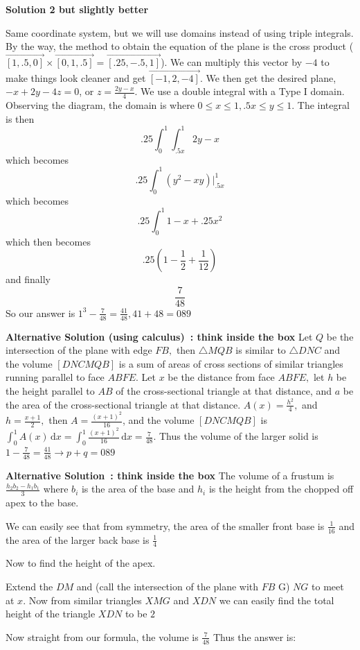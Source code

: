 \begin{enumerate}
 



\textbf{Solution 2 but slightly better}

Same coordinate system, but we will use domains instead of using triple integrals. By the way, the method to obtain the equation of the plane is the cross product ($\vec{[1,.5,0]}\times\vec{[0,1,.5]}=\vec{[.25,-.5,1]}$). We can multiply this vector by $-4$ to make things look cleaner and get $\vec{[-1,2,-4]}$. We then get the desired plane, $-x+2y-4z=0$, or $z=\frac{2y-x}{4}$. We use a double integral with a Type I domain. Observing the diagram, the domain is where $0 \leq x \leq 1, .5x \leq y \leq 1$. The integral is then
 \[.25\int_0^1\int_{.5x}^1 2y - x\]which becomes
 \[.25\int_0^1 (y^2-xy)|_{.5x}^1\]which becomes
 \[.25\int_0^1 1-x+.25x^2\]which then becomes
 \[.25(1-\frac{1}{2}+\frac{1}{12})\]and finally
 \[\frac{7}{48}\]So our answer is $1^3-\frac{7}{48} = \frac{41}{48}, 41+48 = \boxed{089}$

 \textbf{Alternative Solution (using calculus) : think inside the box} Let $Q$ be the intersection of the plane with edge $FB,$ then $\triangle MQB$ is similar to $\triangle DNC$ and the volume $[DNCMQB]$ is a sum of areas of cross sections of similar triangles running parallel to face $ABFE.$ Let $x$ be the distance from face $ABFE,$ let $h$ be the height parallel to $AB$ of the cross-sectional triangle at that distance, and $a$ be the area of the cross-sectional triangle at that distance. $A(x)=\frac{h^2}{4},$ and $h=\frac{x+1}{2},$ then $A=\frac{(x+1)^2}{16}$, and the volume $[DNCMQB]$ is $\int^1_0{A(x)}\,\mathrm{d}x=\int^1_0{\frac{(x+1)^2}{16}}\,\mathrm{d}x=\frac{7}{48}.$ Thus the volume of the larger solid is $1-\frac{7}{48}=\frac{41}{48} \rightarrow p+q = \boxed{089}$

 \textbf{Alternative Solution : think inside the box} The volume of a frustum is $\frac{h_2b_2 -h_1b_1}3$ where $b_i$ is the area of the base and $h_i$ is the height from the chopped off apex to the base.

 We can easily see that from symmetry, the area of the smaller front base is $\frac{1}{16}$ and the area of the larger back base is $\frac{1}4$

 Now to find the height of the apex.

 Extend the $DM$ and (call the intersection of the plane with $FB$ G) $NG$ to meet at $x$. Now from similar triangles $XMG$ and $XDN$ we can easily find the total height of the triangle $XDN$ to be $2$

 Now straight from our formula, the volume is $\frac{7}{48}$ Thus the answer is:


\end{enumerate}
